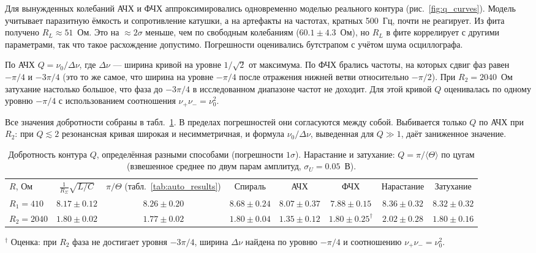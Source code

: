 \documentclass[reprint, amsmath, amssymb, aps, pra, nofootinbib]{revtex4-2}
\begin{document}
Для вынужденных колебаний АЧХ и ФЧХ аппроксимировались одновременно моделью реального контура (рис.~\ref{fig:q_curves}). Модель учитывает паразитную ёмкость и сопротивление катушки, а на артефакты на частотах, кратных 500~Гц, почти не реагирует. Из фита получено $R_L \approx 51$~Ом. Это на $\approx 2\sigma$ меньше, чем по свободным колебаниям ($60.1 \pm 4.3$~Ом), но $R_L$ в фите коррелирует с другими параметрами, так что такое расхождение допустимо. Погрешности оценивались бутстрапом с учётом шума осциллографа.

По АЧХ $Q = \nu_0 / \Delta\nu$, где $\Delta\nu$ — ширина кривой на уровне $1/\sqrt{2}$ от максимума. По ФЧХ брались частоты, на которых сдвиг фаз равен $-\pi/4$ и $-3\pi/4$ (это то же самое, что ширина на уровне $-\pi/4$ после отражения нижней ветви относительно $-\pi/2$). При $R_2 = 2040$~Ом затухание настолько большое, что фаза до $-3\pi/4$ в исследованном диапазоне частот не доходит. Для этой кривой $Q$ оценивалась по одному уровню $-\pi/4$ с использованием соотношения $\nu_+ \nu_- = \nu_0^2$.

Все значения добротности собраны в табл.~\ref{tab:q_summary}. В пределах погрешностей они согласуются между собой. Выбивается только $Q$ по АЧХ при $R_2$: при $Q \lesssim 2$ резонансная кривая широкая и несимметричная, и формула $\nu_0/\Delta\nu$, выведенная для $Q \gg 1$, даёт заниженное значение.





\clearpage
\onecolumngrid
\begin{table}[h!]
    \setlength{\hsize}{\textwidth}\setlength{\columnwidth}{\textwidth}\setlength{\linewidth}{\textwidth}%
    \caption{Добротность контура $Q$, определённая разными способами (погрешности $1\sigma$). Нарастание и затухание: $Q = \pi/\langle\Theta\rangle$ по цугам (взвешенное среднее по двум парам амплитуд, $\sigma_U = 0.05$~В).}
    \label{tab:q_summary}
    \begin{ruledtabular}
        \begin{tabular}{lccccccc}
            $R$, Ом & $\frac{1}{R_\Sigma}\sqrt{L/C}$ & $\pi/\Theta$ (табл.~\ref{tab:auto_results}) & Спираль & АЧХ & ФЧХ & Нарастание & Затухание \\
            \colrule
            $R_1 = 410$  & $8.17 \pm 0.12$ & $8.26 \pm 0.20$ & $8.68 \pm 0.24$ & $8.07 \pm 0.37$ & $7.88 \pm 0.15$ & $8.36 \pm 0.32$ & $8.32 \pm 0.32$ \\
            $R_2 = 2040$ & $1.80 \pm 0.02$ & $1.77 \pm 0.02$ & $1.80 \pm 0.04$ & $1.35 \pm 0.12$ & $1.80 \pm 0.25^{\dagger}$ & $2.02 \pm 0.28$ & $1.80 \pm 0.16$ \\
        \end{tabular}
    \end{ruledtabular}
    \raggedright\footnotesize $^{\dagger}$ Оценка: при $R_2$ фаза не достигает уровня $-3\pi/4$, ширина $\Delta\nu$ найдена по уровню $-\pi/4$ и соотношению $\nu_+\nu_- = \nu_0^2$.
\end{table}
\twocolumngrid
\end{document}
